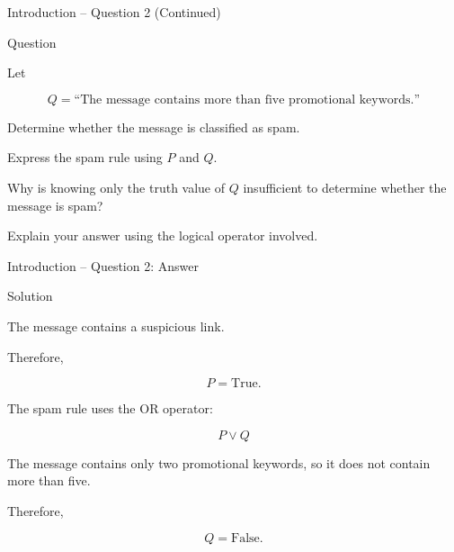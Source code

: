 \begin{frame}{Introduction -- Question 2 (Continued)}

\begin{block}{Question}

Let

\[
Q=\text{``The message contains more than five promotional keywords.''}
\]

\medskip

Determine whether the message is classified as spam.

\medskip

Express the spam rule using $P$ and $Q$.

\medskip

Why is knowing only the truth value of $Q$ insufficient to determine
whether the message is spam?

Explain your answer using the logical operator involved.

\end{block}

\end{frame}


\begin{frame}{Introduction -- Question 2: Answer}

\begin{exampleblock}{Solution}

The message contains a suspicious link.

Therefore,

\[
P=\mathrm{True}.
\]

The spam rule uses the OR operator:

\[
\boxed{P\lor Q}
\]

The message contains only two promotional keywords, so it does not contain
more than five.

Therefore,

\[
Q=\mathrm{False}.
\]

\end{exampleblock}

\end{frame}



